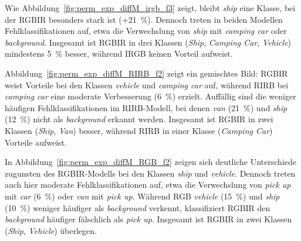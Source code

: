 Wie Abbildung~\ref{fig:perm_exp_diffM_irgb_f3} zeigt, bleibt \textit{ship} eine Klasse, bei der RGBIR besonders stark ist (+21~\%). Dennoch treten in beiden Modellen Fehlklassifikationen auf, etwa die Verwechslung von \textit{ship} mit \textit{camping car} oder \textit{background}. Insgesamt ist RGBIR in drei Klassen (\textit{Ship}, \textit{Camping Car}, \textit{Vehicle}) mindestens 5~\% besser, während IRGB keinen Vorteil aufweist.

%     

Abbildung~\ref{fig:perm_exp_diffM_RIRB_f2} zeigt ein gemischtes Bild: RGBIR weist Vorteile bei den Klassen \textit{vehicle} und \textit{camping car} auf, während RIRB bei \textit{camping car} eine moderate Verbesserung (6~\%) erzielt. Auffällig sind die weniger häufigen Fehlklassifikationen im RIRB-Modell, bei denen \textit{van} (21~\%) und \textit{ship} (12~\%) nicht als \textit{background} erkannt werden. Insgesamt ist RGBIR in zwei Klassen (\textit{Ship}, \textit{Van}) besser, während RIRB in einer Klasse (\textit{Camping Car}) Vorteile aufweist.

%     

In Abbildung~\ref{fig:perm_exp_diffM_RGB_f2} zeigen sich deutliche Unterschiede zugunsten des RGBIR-Modells bei den Klassen \textit{ship} und \textit{vehicle}. Dennoch treten auch hier moderate Fehlklassifikationen auf, etwa die Verwechslung von \textit{pick up} mit \textit{car} (6~\%) oder \textit{van} mit \textit{pick up}. Während RGB \textit{vehicle} (15~\%) und \textit{ship} (10~\%) weniger häufiger als \textit{background} verkennt, klassifiziert RGBIR den \textit{background} häufiger fälschlich als \textit{pick up}. Insgesamt ist RGBIR in zwei Klassen (\textit{Ship}, \textit{Vehicle}) überlegen.

